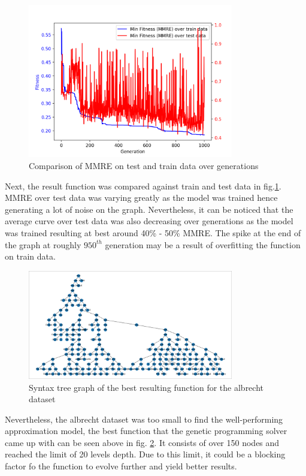 \documentclass[12pt]{article}
\begin{document}
\begin{figure}[H]
  \centering
  \includegraphics[width=0.8\textwidth]{results/albrecht/mmre_train_vs_test}
  \caption{Comparison of MMRE on test and train data over generations}
  \label{train_test_albrecht}
\end{figure}
Next, the result function was compared against train and test data in fig.\ref{train_test_albrecht}. MMRE over test data was varying greatly as the model was trained hence generating a lot of noise on the graph. Nevertheless, it can be noticed that the average curve over test data was also decreasing over generations as the model was trained resulting at best around 40\% - 50\% MMRE. The spike at the end of the graph at roughly $950^{th}$ generation may be a result of overfitting the function on train data.

\begin{figure}[H]
  \centering
  \includegraphics[width=0.8\textwidth]{results/albrecht/test_function}
  \caption{Syntax tree graph of the best resulting function for the albrecht dataset}
  \label{function_albrecht}
\end{figure}

Nevertheless, the albrecht dataset was too small to find the well-performing approximation model, the best function that the genetic programming solver came up with can be seen above in fig. \ref{function_albrecht}. It consists of over 150 nodes and reached the limit of 20 levels depth. Due to this limit, it could be a blocking factor fo the function to evolve further and yield better results.
\end{document}
